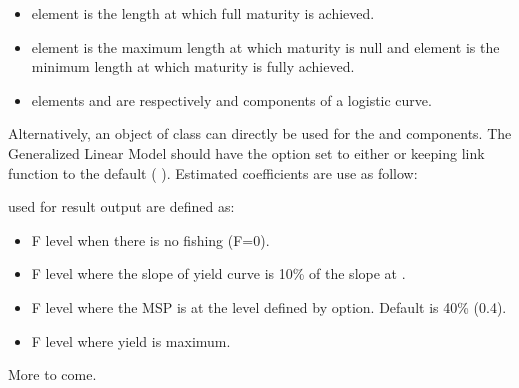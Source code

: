 \documentclass[a4paper]{book}
\begin{document}
\begin{Details}
\begin{itemize}
\item {}  element \code{[[2]]} is the length at which full maturity is achieved.

\item {}  element \code{[[2]]} is the maximum length at which maturity is null and 
element \code{[[3]]} is the minimum length at which maturity is fully achieved.

\item {}  elements \code{[[2]]} and \code{[[3]]} are respectively \eqn{\alpha}{} and \eqn{\beta}{} 
components of a logistic curve.

\end{itemize}

Alternatively, an object of class  can directly be used for the  and  components. 
The Generalized Linear Model should have  the option  set to either  or  keeping link function to the 
default ( ).
Estimated coefficients are use as follow: 



 used for result output are defined as:
\begin{itemize}

\item {}  F level when there is no fishing (F=0).
\item {}    F level where the slope of yield curve is 10\% of the slope at . 
\item {}    F level where the MSP is at the level defined by  option. Default is 40\% (0.4).
\item {}   F level where yield is maximum.

\end{itemize}


More to come.
\end{Details}
%
\end{document}
